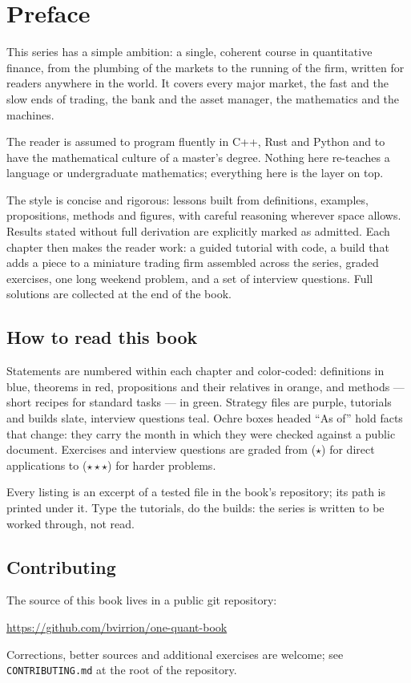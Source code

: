 \chapter{Preface}

This series has a simple ambition: a single, coherent course in quantitative
finance, from the plumbing of the markets to the running of the firm, written
for readers anywhere in the world. It covers every major market, the fast and
the slow ends of trading, the bank and the asset manager, the mathematics and
the machines.

The reader is assumed to program fluently in C++, Rust and Python and to have
the mathematical culture of a master's degree. Nothing here re-teaches a
language or undergraduate mathematics; everything here is the layer on top.

The style is concise and rigorous: lessons built from definitions, examples,
propositions, methods and figures, with careful reasoning wherever space
allows. Results stated without full derivation are explicitly marked as
admitted. Each chapter then makes the reader work: a guided tutorial with
code, a build that adds a piece to a miniature trading firm assembled across
the series, graded exercises, one long weekend problem, and a set of
interview questions. Full solutions are collected at the end of the book.

\section*{How to read this book}

Statements are numbered within each chapter and color-coded: definitions in
blue, theorems in red, propositions and their relatives in orange, and
methods --- short recipes for standard tasks --- in green. Strategy files are
purple, tutorials and builds slate, interview questions teal. Ochre boxes
headed ``As of'' hold facts that change: they carry the month in which they
were checked against a public document. Exercises and interview questions are
graded from ($\star$) for direct applications to ($\star\star\star$) for
harder problems.

Every listing is an excerpt of a tested file in the book's repository; its
path is printed under it. Type the tutorials, do the builds: the series is
written to be worked through, not read.

\section*{Contributing}

The source of this book lives in a public git repository:
\begin{center}
\url{https://github.com/bvirrion/one-quant-book}
\end{center}
Corrections, better sources and additional exercises are
welcome; see \texttt{CONTRIBUTING.md} at the root of the repository.
